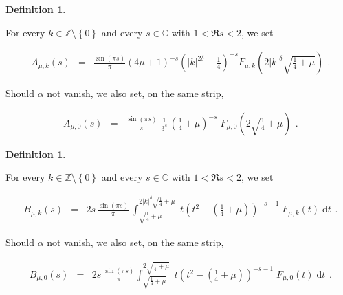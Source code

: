 \documentclass{jams-l}
\theoremstyle{definition}
\newtheorem{definition}[theorem]{Definition}
\theoremstyle{remark}
\numberwithin{equation}{section}
\begin{document}
            \begin{definition}
            \label{DefAmuk}
        
                For every $k \in \mathbb{Z} \setminus \left \{ 0 \right \}$ and every $s \in \mathbb{C}$ with $1 < \Re s < 2$, we set
            
                \[ \begin{array}{lll}
                        A_{\mu,k} \left( s \right) & = & \displaystyle \frac{\sin \left( \pi s \right)}{\pi} \left( 4 \mu + 1 \right)^{-s} \left( \left \vert k \right \vert^{2 \delta} - \frac{1}{4} \right)^{-s} F_{\mu,k} \left( 2 \left \vert k \right \vert^{\delta} \sqrt{\frac{1}{4}+\mu} \right)
                    \end{array} . \]
            
                \noindent Should $\alpha$ not vanish, we also set, on the same strip,
            
                \[ \begin{array}{lll}
                        A_{\mu,0} \left( s \right) & = & \displaystyle \frac{\sin \left( \pi s \right)}{\pi} \; \frac{1}{3^s} \, \left( \frac{1}{4}+\mu \right)^{-s} \; F_{\mu,0} \left( 2 \sqrt{\frac{1}{4}+\mu} \right)
                    \end{array} . \]
        
            \end{definition}
        
            \begin{definition}
            \label{DefBmuk}
        
                For every $k \in \mathbb{Z} \setminus \left \{ 0 \right \}$ and every $s \in \mathbb{C}$ with $1 < \Re s < 2$, we set
                
                \[ \begin{array}{lll}
                        B_{\mu,k} \left( s \right) & = & \displaystyle 2s \, \frac{\sin \left( \pi s \right)}{\pi} \, \int_{\sqrt{\frac{1}{4}+\mu}}^{2 \left \vert k \right \vert^{\delta} \sqrt{\frac{1}{4}+\mu}} \; t \left( t^2 - \left( \frac{1}{4}+\mu \right) \right)^{-s-1} \; F_{\mu,k} \left( t \right) \; \text{d}t
                    \end{array} . \]
            
                \noindent Should $\alpha$ not vanish, we also set, on the same strip,
            
                \[ \begin{array}{lll}
                        B_{\mu,0} \left( s \right) & = & \displaystyle 2s \, \frac{\sin \left( \pi s \right)}{\pi} \int_{\sqrt{\frac{1}{4}+\mu}}^{2 \sqrt{\frac{1}{4}+\mu}} \; t \left( t^2 - \left( \frac{1}{4}+\mu \right) \right)^{-s-1} \; F_{\mu,0} \left( t \right) \; \text{d}t
                    \end{array} . \]
        
            \end{definition}
            
\end{document}
